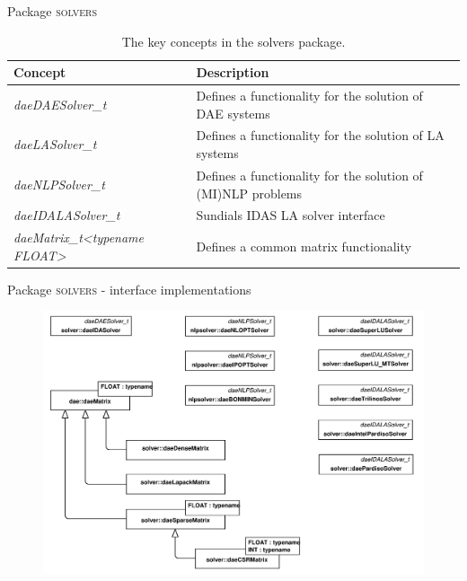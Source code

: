 \documentclass[compress,newPxFont,sthlmFooter]{beamer}
\begin{document}
\begin{frame}{Package \textsc{solvers}}
\scriptsize
{
\begin{table}
  \caption{The key concepts in the \alert{solvers} package.}
  \begin{tabularx}{\linewidth}{l>{\raggedright}X}
    \toprule
    \textcolor{sthlmRed}{\textbf{Concept}} & \textcolor{sthlmRed}{\textbf{Description}} \tabularnewline
    \midrule
    \textcolor{sthlmRed}{\textit{daeDAESolver\_t}} & Defines a functionality for the solution of DAE systems \tabularnewline 
    \textcolor{sthlmRed}{\textit{daeLASolver\_t}} & Defines a functionality for the solution of LA systems \tabularnewline
    \textcolor{sthlmRed}{\textit{daeNLPSolver\_t}} & Defines a functionality for the solution of (MI)NLP problems \tabularnewline
    \textcolor{sthlmRed}{\textit{daeIDALASolver\_t}} & Sundials IDAS LA solver interface \tabularnewline
    \midrule
    \textcolor{sthlmRed}{\textit{daeMatrix\_t<typename FLOAT>}} & Defines a common matrix functionality \tabularnewline
    \bottomrule
  \end{tabularx}
\end{table}
}
\end{frame}

\begin{frame}{Package \textsc{solvers} - interface implementations}
    \begin{center}
        \begin{figure}
            \includegraphics[width=0.75\paperwidth]{Supplemental_Figure_S5.png}      
        \end{figure}
    \end{center}
\end{frame}
\end{document}
